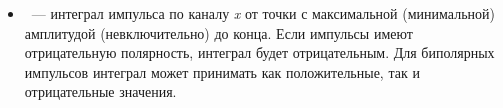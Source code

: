 \documentclass[12pt, a4paper, oneside, onecolumn]{book}
\begin{document}
\begin{itemize}
\item {}~--- интеграл импульса по каналу {\it x} от точки с максимальной (минимальной) амплитудой (невключительно) до конца.  Если импульсы имеют отрицательную полярность, интеграл будет отрицательным.  Для биполярных импульсов интеграл может принимать как положительные, так и отрицательные значения.

\end{itemize}


\printbibliography
\end{document}
